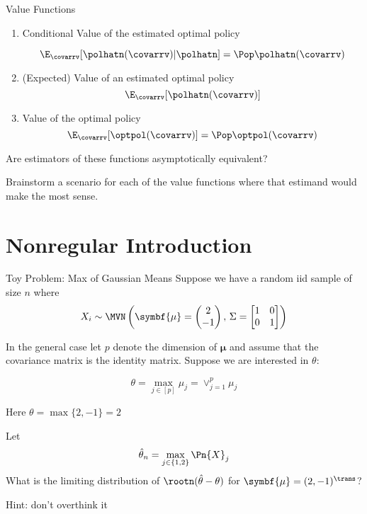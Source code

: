 \documentclass[aspectratio=169, professionalfonts]{beamer}
\begin{document}
\begin{frame}{Value Functions}
	\begin{enumerate}
		\item Conditional Value of the estimated optimal policy

		      $$\E_{\covarrv}[\polhatn(\covarrv) \vert \polhatn] = \Pop \polhatn(\covarrv)$$

		\item (Expected) Value of an estimated optimal policy
		      $$\E_{\covarrv}[\polhatn(\covarrv)]$$

		\item Value of the optimal policy
		      $$\E_{\covarrv}[\optpol(\covarrv)] = \Pop \optpol(\covarrv)$$
	\end{enumerate}

	\vfill \pause

	Are estimators of these functions asymptotically equivalent?

	\vfill \pause
	Brainstorm a scenario for each of the value functions where that estimand would
	make the most sense.
\end{frame}

\section{Nonregular Introduction}
\begin{frame}{Toy Problem: Max of Gaussian Means}
	Suppose we have a random iid sample of size $n$ where
	\begin{equation*}
		X_i \sim \MVN \left(\symbf{\mu} = \begin{pmatrix}2 \\ -1 \end{pmatrix},\, \Sigma = \begin{bmatrix}1 & 0
               \\ 0 & 1\end{bmatrix} \right)
	\end{equation*}

	\vfill
	\pause

	In the general case let $p$ denote the dimension of $\symbf{\mu}$ and assume that
	the covariance matrix is the identity matrix. Suppose we are interested in $\theta$:

	$$\theta = \max_{j \in
			[p]} \mu_j = \displaystyle \lor_{j = 1}^{p} \mu_j$$
	\vfill

	Here $\theta = \max \{2, -1\} = 2$

	\vfill
	\pause
	Let $$\hat{\theta}_n = \max_{j \in \{1, 2 \}} \Pn {X}_j $$
	\vfill
	\pause
	What is the limiting distribution of $\rootn (\hat{\theta} - \theta)$ for $\symbf{\mu} =
		(2, -1 )^{\trans}$?

	Hint: don't overthink it
\end{frame}
\end{document}
